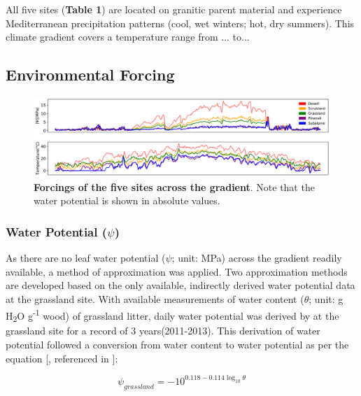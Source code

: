 \documentclass[letterpaper, 10pt]{article}
\begin{document}
All five sites (\textbf{Table 1}) are located on granitic parent material and experience
 Mediterranean precipitation patterns (cool, wet winters; hot, dry summers). This climate 
 gradient covers a temperature range from ... to...



\subsection{\large Environmental Forcing}

\begin{figure}[h]
\centering
      \includegraphics[width=1.0\linewidth]{../figures/gradient_forcing.pdf}
      \caption{\textbf{Forcings of the five sites across the gradient}. Note that the water potential is shown in absolute values.}
      \label{fig: figure 2}
\end{figure}

\subsubsection{Water Potential ($\psi$)}
As there are no leaf water potential ($\psi$; unit: MPa) across
the gradient readily available, a method of approximation was applied. Two approximation methods are developed based on
the only available, indirectly derived water potential data at the grassland site. With available measurements of water content ($\theta$; unit: g H\textsubscript{2}O g\textsuperscript{-1} wood) of grassland litter, daily water
potential was derived by \citet{allison2017consequences} at the grassland site
for a record of 3 years(2011-2013). This derivation of water potential followed a conversion
from water content to water potential as per the equation [\citet{dix1985changes}, referenced in \citet{allison2017consequences}]:

\begin{equation}
  \psi_{grassland} = -10^{0.118-0.114\log_{10} \theta}
\end{equation}
\end{document}
